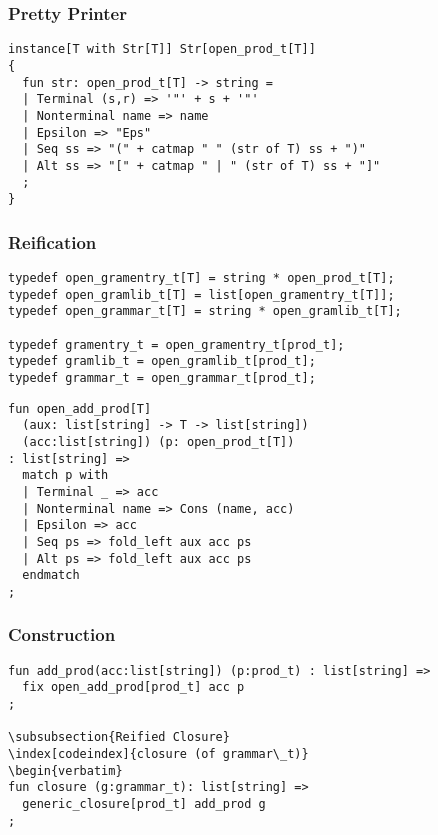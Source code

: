 \documentclass[oneside]{book}
\begin{document}
\subsubsection{Pretty Printer}
\begin{verbatim}
instance[T with Str[T]] Str[open_prod_t[T]] 
{
  fun str: open_prod_t[T] -> string =
  | Terminal (s,r) => '"' + s + '"'
  | Nonterminal name => name
  | Epsilon => "Eps"
  | Seq ss => "(" + catmap " " (str of T) ss + ")"
  | Alt ss => "[" + catmap " | " (str of T) ss + "]"
  ;
}
\end{verbatim}

\subsubsection{Reification}
\begin{verbatim}
typedef open_gramentry_t[T] = string * open_prod_t[T];
typedef open_gramlib_t[T] = list[open_gramentry_t[T]];
typedef open_grammar_t[T] = string * open_gramlib_t[T];

typedef gramentry_t = open_gramentry_t[prod_t];
typedef gramlib_t = open_gramlib_t[prod_t];
typedef grammar_t = open_grammar_t[prod_t];
\end{verbatim}

\begin{verbatim}
fun open_add_prod[T] 
  (aux: list[string] -> T -> list[string])
  (acc:list[string]) (p: open_prod_t[T]) 
: list[string] =>
  match p with
  | Terminal _ => acc
  | Nonterminal name => Cons (name, acc) 
  | Epsilon => acc
  | Seq ps => fold_left aux acc ps
  | Alt ps => fold_left aux acc ps
  endmatch
;
\end{verbatim}

\subsubsection{Construction}
\begin{verbatim}
fun add_prod(acc:list[string]) (p:prod_t) : list[string] =>
  fix open_add_prod[prod_t] acc p
;

\subsubsection{Reified Closure}
\index[codeindex]{closure (of grammar\_t)}
\begin{verbatim}
fun closure (g:grammar_t): list[string] =>
  generic_closure[prod_t] add_prod g
;
\end{verbatim}
\end{document}
